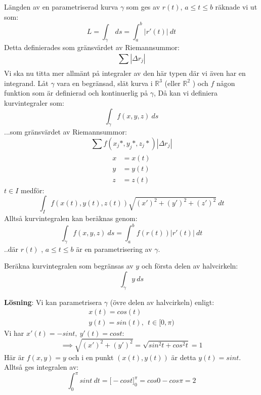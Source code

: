 \documentclass{report}
\begin{document}
{
Längden av en parametriserad kurva $ \gamma $ som ges av $ r(t) $, $ a \le t \le b $ räknade vi ut som:
\begin{equation*}
L = \int_{ \gamma}^{}  \: ds = \int_{a}^{b} |r'(t)| \: dt 
\end{equation*}
Detta definierades som gränsvärdet av Riemannsummor:
\begin{equation*}
\sum_{}^{} |\Delta r_j|
\end{equation*}
Vi ska nu titta mer allmänt på integraler av den här typen där vi även har en integrand.
}
{
Låt $ \gamma $ vara en begränsad, slät kurva i $ \mathbb{R}^3 $ (eller $ \mathbb{R}^2 $ ) och $ f $ någon funktion som är definierad och kontinuerlig på $ \gamma $, Då kan vi definiera kurvintegraler som:
\begin{equation*}
\int_{ \gamma}^{} f(x,y,z) \: ds 
\end{equation*}
...som gränsvärdet av Riemannsummor:
\begin{equation*}
\sum_{}^{} f(x_j*, y_j*, z_j*) | \Delta r_j|
\end{equation*}
\begin{align*}
	x &= x(t)\\
	y &= y(t)\\
	z &= z(t)
\end{align*}
$ t \in I $ medför:
\begin{equation*}
\int_{I}^{} f(x(t),y(t),z(t)) \sqrt{(x')^2+(y')^2+(z')^2}  \: dt 
\end{equation*}
Alltså kurvintegralen kan beräknas genom:
\begin{equation*}
\int_{ \gamma}^{} f(x,y,z) \: ds = \int_{a}^{b} f(r(t)) |r'(t)|\: dt  
\end{equation*}
..där $ r(t) $ , $ a \le t  \le b$ är en parametrisering av $ \gamma $. 
}

\ex{}
{
Beräkna kurvintegralen som begränsas av $ y $ och första delen av halvcirkeln:
\begin{equation*}
\int_{ \gamma}^{} y \: ds 
\end{equation*}

\textbf{Lösning}: Vi kan parametrisera $ \gamma $ (övre delen av halvcirkeln) enligt:
\begin{align*}
x(t) = cos(t)\\
y(t) = sin(t), \:\: t \in [0,\pi)
\end{align*}
Vi har $ x'(t) = -sint, \: y'(t) = cost $:
\begin{equation*}
\implies \sqrt{(x')^2+(y')^2} = \sqrt{sin^2t+cos^2t} = 1
\end{equation*}
Här är $ f(x,y) = y $ och i en punkt $ (x(t), y(t)) $ är detta $ y(t) = sint $. Alltså ges integralen av:
\begin{equation*}
	\int_{0}^{ \pi} sint \: dt = \bigl[ -cost \bigr]_0^{ \pi } = cos0 - cos\pi = 2 
\end{equation*}
}
\end{document}

